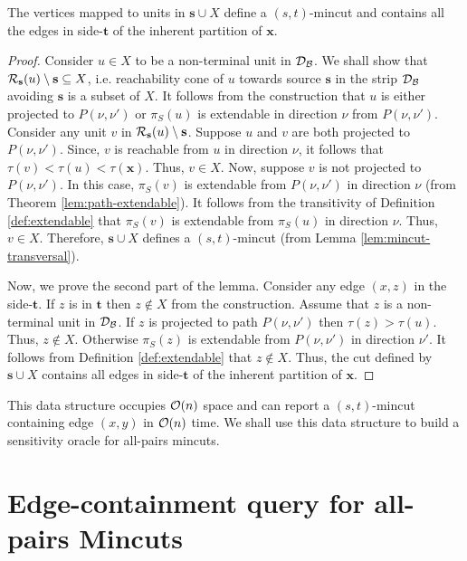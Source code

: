 \begin{lemma}
The vertices mapped to units in ${\mathbf s}\cup X$ define a $(s,t)$-mincut and contains all the edges in side-$\mathbf t$ of the inherent partition of $\mathbf x$.
\end{lemma}
\begin{proof}
Consider $u \in X$ to be a non-terminal unit in ${\cal D}_{\cal B}$. We shall show that ${\cal R}_{\mathbf s}(u)\setminus \mathbf{s} \subseteq X$, i.e. reachability cone of $u$ towards source $\mathbf{s}$ in the strip ${\cal D}_{\cal B}$ avoiding $\mathbf s$ is a subset of $X$. It follows from the construction that $u$ is either projected to $P(\nu,\nu')$ or $\pi_S(u)$ is extendable in direction $\nu$ from $P(\nu,\nu')$. Consider any unit $v$ in ${\cal R}_{\mathbf s}(u)\setminus \mathbf{s}$. Suppose $u$ and $v$ are both projected to $P(\nu,\nu')$. Since, $v$ is reachable from $u$ in direction $\nu$, it follows that $\tau(v) < \tau(u) < \tau(\mathbf{x})$. Thus, $v \in X$. Now, suppose $v$ is not projected to $P(\nu,\nu')$. In this case, $\pi_S(v)$ is extendable from $P(\nu,\nu')$ in direction $\nu$ (from Theorem \ref{lem:path-extendable}). It follows from the transitivity of Definition \ref{def:extendable} that $\pi_S(v)$ is extendable from $\pi_S(u)$ in direction $\nu$. Thus, $v \in X$. Therefore, ${\mathbf s}\cup X$ defines a $(s,t)$-mincut (from Lemma \ref{lem:mincut-transversal}).

Now, we prove the second part of the lemma. Consider any edge $(x,z)$ in the side-$\mathbf{t}$. If $z$ is in $\mathbf t$ then $z \not \in X$ from the construction. Assume that $z$ is a non-terminal unit in ${\cal D}_{\cal B}$. If $z$ is projected to path $P(\nu,\nu')$ then $\tau(z) > \tau(u)$. Thus, $z \not \in X$. Otherwise $\pi_S(z)$ is extendable from $P(\nu,\nu')$ in direction $\nu'$. It follows from Definition \ref{def:extendable} that $z \not \in X$. Thus, the cut defined by ${\mathbf s} \cup X$ contains all edges in side-$\mathbf{t}$ of the inherent partition of $\mathbf x$.

\end{proof}

This data structure occupies ${\cal O}(n)$ space and can report a $(s,t)$-mincut containing edge $(x,y)$ in ${\cal O}(n)$ time. We shall use this data structure to build a sensitivity oracle for all-pairs mincuts.


\section{Edge-containment query for all-pairs Mincuts}

